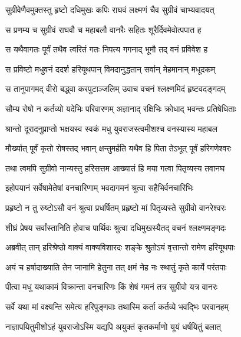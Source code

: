 
\twolineshloka
{सुग्रीवेणैवमुक्तस्तु हृष्टो दधिमुखः कपिः}
{राघवं लक्ष्मणं चैव सुग्रीवं चाभ्यवादयत्} %

\twolineshloka
{स प्रणम्य च सुग्रीवं राघवौ च महाबलौ}
{वानरैः सहितः शूरैर्दिवमेवोत्पपात ह} %

\twolineshloka
{स यथैवागतः पूर्वं तथैव त्वरितं गतः}
{निपत्य गगनाद् भूमौ तद् वनं प्रविवेश ह} %

\twolineshloka
{स प्रविष्टो मधुवनं ददर्श हरियूथपान्}
{विमदानुद्धतान् सर्वान् मेहमानान् मधूदकम्} %

\twolineshloka
{स तानुपागमद् वीरो बद्ध्वा करपुटाञ्जलिम्}
{उवाच वचनं श्लक्ष्णमिदं हृष्टवदङ्गदम्} %

\twolineshloka
{सौम्य रोषो न कर्तव्यो यदेभिः परिवारणम्}
{अज्ञानाद् रक्षिभिः क्रोधाद् भवन्तः प्रतिषेधिताः} %

\twolineshloka
{श्रान्तो दूरादनुप्राप्तो भक्षयस्व स्वकं मधु}
{युवराजस्त्वमीशश्च वनस्यास्य महाबल} %

\twolineshloka
{मौर्ख्यात् पूर्वं कृतो रोषस्तद् भवान् क्षन्तुमर्हति}
{यथैव हि पिता तेऽभूत् पूर्वं हरिगणेश्वरः} %

\twolineshloka
{तथा त्वमपि सुग्रीवो नान्यस्तु हरिसत्तम}
{आख्यातं हि मया गत्वा पितृव्यस्य तवानघ} %

\twolineshloka
{इहोपयानं सर्वेषामेतेषां वनचारिणाम्}
{भवदागमनं श्रुत्वा सहैभिर्वनचारिभिः} %

\twolineshloka
{प्रहृष्टो न तु रुष्टोऽसौ वनं श्रुत्वा प्रधर्षितम्}
{प्रहृष्टो मां पितृव्यस्ते सुग्रीवो वानरेश्वरः} %

\twolineshloka
{शीघ्रं प्रेषय सर्वांस्तानिति होवाच पार्थिवः}
{श्रुत्वा दधिमुखस्यैतद् वचनं श्लक्ष्णमङ्गदः} %

\twolineshloka
{अब्रवीत् तान् हरिश्रेष्ठो वाक्यं वाक्यविशारदः}
{शङ्के श्रुतोऽयं वृत्तान्तो रामेण हरियूथपाः} %

\twolineshloka
{अयं च हर्षादाख्याति तेन जानामि हेतुना}
{तत् क्षमं नेह नः स्थातुं कृते कार्ये परंतपाः} %

\twolineshloka
{पीत्वा मधु यथाकामं विक्रान्ता वनचारिणः}
{किं शेषं गमनं तत्र सुग्रीवो यत्र वानरः} %

\twolineshloka
{सर्वे यथा मां वक्ष्यन्ति समेत्य हरिपुङ्गवाः}
{तथास्मि कर्ता कर्तव्ये भवद्भिः परवानहम्} %

\twolineshloka
{नाज्ञापयितुमीशोऽहं युवराजोऽस्मि यद्यपि}
{अयुक्तं कृतकर्माणो यूयं धर्षयितुं बलात्} %


